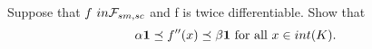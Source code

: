 \begin{exercise}[]{}
	Suppose that $ f \ in \mathcal{F}_{sm,sc} $ and f is twice differentiable. Show that 
\begin{equation*}
	\alpha \mathbf{1}\preceq f''(x) \preceq \beta \mathbf{1} \text{ for all $ x\in int(K). $} 
\end{equation*}

\end{exercise}

\begin{solution}[TODO]
\end{solution}
